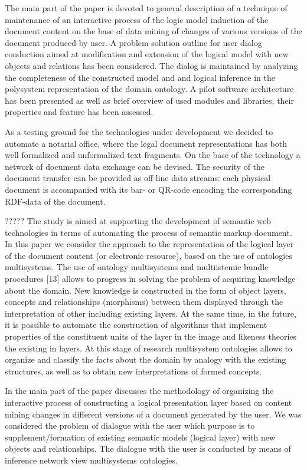 \documentclass[conference]{IEEEtran}
\begin{document}
The main part of the paper is devoted to general description of a
technique of maintenance of an interactive process of the logic model
induction of the document content on the base of data mining of
changes of various versions of the document produced by user.  A
problem solution outline for user dialog conduction aimed at
modification and extension of the logical model with new objects and
relations has been considered.  The dialog is maintained by analyzing
the completeness of the constructed model and and logical inference in
the polysystem representation of the domain ontology.  A pilot
software architecture has been presented as well as brief overview of
used modules and libraries, their properties and feature has been
assessed.

As a testing ground for the technologies under development we decided
to automate a notarial office, where the legal document
representations has both well formalized and unformalized text
fragments.  On the base of the technology a network of document data
exchange can be devised. The security of the document transfer can
be provided as off-line data streams: each physical document is
accompanied with its bar- or QR-code encoding the corresponding
RDF-data of the document.


????? The study is aimed at supporting the development of semantic web technologies in terms of automating the process of semantic markup document. In this paper we consider the approach to the representation of the logical layer of the document content (or electronic resource), based on the use of ontologies multisystems. The use of ontology multisystems and multiistemic bundle procedures [13] allows to progress in solving the problem of acquiring knowledge about the domain. New knowledge is constructed in the form of object layers, concepts and relationships (morphisms) between them displayed through the interpretation of other including existing layers. At the same time, in the future, it is possible to automate the construction of algorithms that implement properties of the constituent units of the layer in the image and likeness theories the existing in layers. At this stage of research multisystem ontologies allows  to organize and classify the facts about the domain by analogy with the existing structures, as well as to obtain new interpretations of formed concepts.

	In the main part of the paper discusses the methodology of organizing the interactive process of constructing a logical presentation layer based on content mining changes in different versions of a document generated by the user. We was considered the problem of dialogue with the user which purpose is to supplement/formation of existing semantic models (logical layer) with new objects and relationships. The dialogue with the user is conducted by means of inference network view multisystems ontologies.
\end{document}
